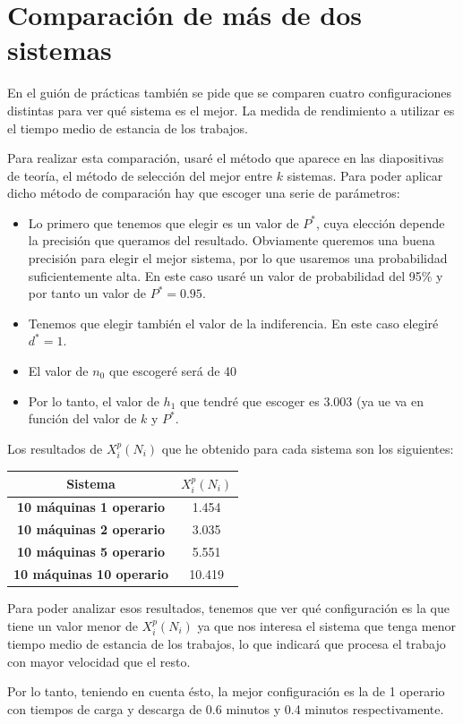 \documentclass[11pt,a4paper]{report}
\begin{document}
\section{Comparación de más de dos sistemas}

En el guión de prácticas también se pide que se comparen cuatro configuraciones distintas para ver qué sistema es el mejor. La medida de rendimiento a utilizar es el tiempo medio de estancia de los trabajos.

Para realizar esta comparación, usaré el método que aparece en las diapositivas de teoría, el método de selección del mejor entre $k$ sistemas. Para poder aplicar dicho método de comparación hay que escoger una serie de parámetros:

\begin{itemize}
	\item{Lo primero que tenemos que elegir es un valor de $P^*$, cuya elección depende la precisión que queramos del resultado. Obviamente queremos una buena precisión para elegir el mejor sistema, por lo que usaremos una probabilidad suficientemente alta. En este caso usaré un valor de probabilidad del 95\% y por tanto un valor de $P^*=0.95$.}
	\item{Tenemos que elegir también el valor de la indiferencia. En este caso elegiré $d^*=1$.}
	\item{El valor de $n_0$ que escogeré será de 40}
	\item{Por lo tanto, el valor de $h_1$ que tendré que escoger es 3.003 (ya ue va en función del valor de $k$ y $P^*$.}
\end{itemize}

Los resultados de $X^p_i(N_i)$ que he obtenido para cada sistema son los siguientes: 

\begin{center}
\begin{tabular}{|c|c|}
\hline
	\textbf{Sistema} & \textbf{$X^p_i(N_i)$}\\
\hline
	\textbf{10 máquinas 1 operario} & 1.454\\
\hline
	\textbf{10 máquinas 2 operario} & 3.035\\
\hline
	\textbf{10 máquinas 5 operario} & 5.551\\
\hline
	\textbf{10 máquinas 10 operario} & 10.419\\
\hline
\end{tabular}
\end{center}

Para poder analizar esos resultados, tenemos que ver qué configuración es la que tiene un valor menor de $X^p_i(N_i)$ ya que nos interesa el sistema que tenga menor tiempo medio de estancia de los trabajos, lo que indicará que procesa el trabajo con mayor velocidad que el resto.

Por lo tanto, teniendo en cuenta ésto, la mejor configuración es la de 1 operario con tiempos de carga y descarga de 0.6 minutos y 0.4 minutos respectivamente.
\end{document}
